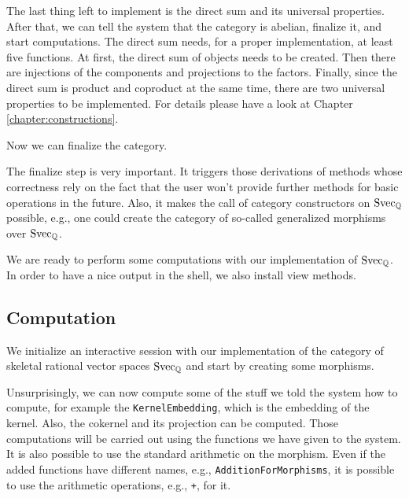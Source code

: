 The last thing left to implement is the direct sum and its universal properties. After that, we can tell the system that the
category is abelian, finalize it, and start computations. The direct sum needs, for a proper implementation, at least five
functions. At first, the direct sum of objects needs to be created. Then there are injections of the components and projections
to the factors. Finally, since the direct sum is product and coproduct at the same time, there are two universal properties to be implemented.
For details please have a look at Chapter \ref{chapter:constructions}.



Now we can finalize the category.



The finalize step is very important. It triggers those derivations of methods whose correctness
rely on the fact that the user won't provide further methods for basic operations in the future.
Also, it makes the call of category constructors on $\mathrm{Svec}_{\mathbb{Q}}$ possible, e.g.,
one could create the category of so-called generalized morphisms over $\mathrm{Svec}_{\mathbb{Q}}$.

We are ready to perform some computations with our implementation of $\mathrm{Svec}_{\mathbb{Q}}$.
In order to have a nice output in the \GAP shell, we also install view methods.



\subsection{Computation}\label{subsection:skeletal_vec_computation}

We initialize an interactive session with our implementation of the category of skeletal rational vector spaces $\mathrm{Svec}_{\mathbb{Q}}$
and start by creating some morphisms.

\begin{small}

\end{small}

Unsurprisingly, we can now compute some of the stuff we told the system how to compute, for example the \texttt{KernelEmbedding},
which is the embedding of the kernel. Also, the cokernel and its projection can be computed. Those computations will
be carried out using the functions we have given to the system. It is also possible to use the standard arithmetic on the morphism.
Even if the added functions have different names, e.g., \texttt{AdditionForMorphisms}, it is possible to use the \GAP arithmetic
operations, e.g., \texttt{+}, for it.

